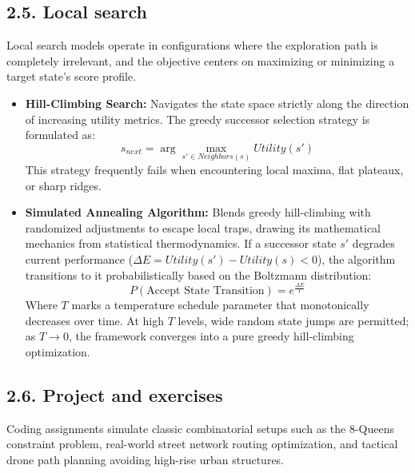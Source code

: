 \documentclass[../main.tex]{subfiles}
\begin{document}
\subsection{2.5. Local search}
Local search models operate in configurations where the exploration path is completely irrelevant, and the objective centers on maximizing or minimizing a target state's score profile.
\begin{itemize}
    \item \textbf{Hill-Climbing Search:} Navigates the state space strictly along the direction of increasing utility metrics. The greedy successor selection strategy is formulated as:
    \begin{equation}
        s_{next} = \arg\max_{s' \in Neighbors(s)} Utility(s')
    \end{equation}
    This strategy frequently fails when encountering local maxima, flat plateaux, or sharp ridges.
    \item \textbf{Simulated Annealing Algorithm:} Blends greedy hill-climbing with randomized adjustments to escape local traps, drawing its mathematical mechanics from statistical thermodynamics. If a successor state $s'$ degrades current performance ($\Delta E = Utility(s') - Utility(s) < 0$), the algorithm transitions to it probabilistically based on the Boltzmann distribution:
    \begin{equation}
        P(\text{Accept State Transition}) = e^{\frac{\Delta E}{T}}
    \end{equation}
    Where $T$ marks a temperature schedule parameter that monotonically decreases over time. At high $T$ levels, wide random state jumps are permitted; as $T \rightarrow 0$, the framework converges into a pure greedy hill-climbing optimization.
\end{itemize}

\subsection{2.6. Project and exercises}
Coding assignments simulate classic combinatorial setups such as the 8-Queens constraint problem, real-world street network routing optimization, and tactical drone path planning avoiding high-rise urban structures.
\end{document}
